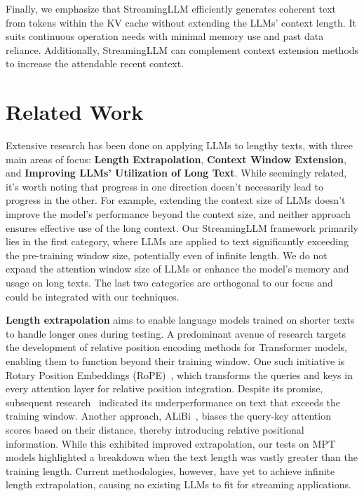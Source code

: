 Finally, we emphasize that StreamingLLM efficiently generates coherent text from tokens within the KV cache without extending the LLMs' context length. It suits continuous operation needs with minimal memory use and past data reliance. Additionally, StreamingLLM can complement context extension methods to increase the attendable recent context.

\section{Related Work}

Extensive research has been done on applying LLMs to lengthy texts, with three main areas of focus: \textbf{Length Extrapolation}, \textbf{Context Window Extension}, and \textbf{Improving LLMs' Utilization of Long Text}. While seemingly related, it's worth noting that progress in one direction doesn't necessarily lead to progress in the other. For example, extending the context size of LLMs doesn't improve the model's performance beyond the context size, and neither approach ensures effective use of the long context. Our StreamingLLM framework primarily lies in the first category, where LLMs are applied to text significantly exceeding the pre-training window size, potentially even of infinite length. We do not expand the attention window size of LLMs or enhance the model's memory and usage on long texts. The last two categories are orthogonal to our focus and could be integrated with our techniques.

\textbf{Length extrapolation} aims to enable language models trained on shorter texts to handle longer ones during testing. A predominant avenue of research targets the development of relative position encoding methods for Transformer models, enabling them to function beyond their training window. One such initiative is Rotary Position Embeddings (RoPE)~\citep{su2021roformer}, which transforms the queries and keys in every attention layer for relative position integration. Despite its promise, subsequent research~\citep{alibi, chen2023extending} indicated its underperformance on text that exceeds the training window. Another approach, ALiBi~\citep{alibi}, biases the query-key attention scores based on their distance, thereby introducing relative positional information. While this exhibited improved extrapolation, our tests on MPT models highlighted a breakdown when the text length was vastly greater than the training length. Current methodologies, however, have yet to achieve infinite length extrapolation, causing no existing LLMs to fit for streaming applications.

